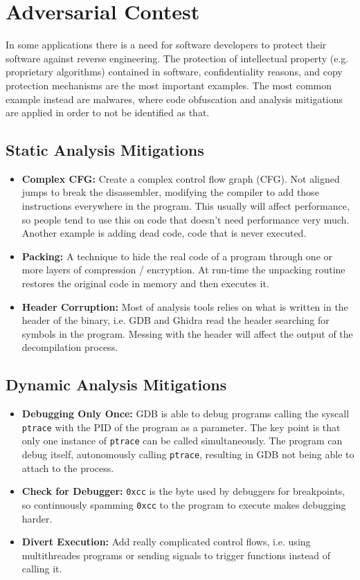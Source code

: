 \documentclass{article}
\begin{document}
\pagebreak
\section{Adversarial Contest}

In some applications there is a need for software developers to protect their software against reverse engineering. 
The protection of intellectual property (e.g. proprietary algorithms) contained in software, confidentiality reasons, 
and copy protection mechanisms are the most important examples. \citep{codeobf} 
The most common example instead are malwares, where code obfuscation and analysis
mitigations are applied in order to not be identified as that.

\subsection{Static Analysis Mitigations}

\begin{itemize}
\item{\textbf{Complex CFG:}} Create a complex control flow graph (CFG). Not aligned jumps to break the disassembler, 
modifying the compiler to add those instructions everywhere in the program. This usually will affect 
performance, so people tend to use this on code that doesn’t need performance very much. Another example is adding 
dead code, code that is never executed.
\item{\textbf{Packing:}} A technique to hide the real code of a program through one or more layers of compression / 
encryption. At run-time the unpacking routine restores the original code in memory and then executes it.
\item{\textbf{Header Corruption:}} Most of analysis tools relies on what is written in the header of the binary,
i.e. GDB and Ghidra read the header searching for symbols in the program. Messing with the header will affect the
output of the decompilation process.
\end{itemize}

\subsection{Dynamic Analysis Mitigations}

\begin{itemize}
\item{\textbf{Debugging Only Once:}} GDB is able to debug programs calling the syscall \texttt{ptrace} with the PID of
the program as a parameter. The key point is that only one instance of \texttt{ptrace} can be called simultaneously. 
The program can debug itself, autonomously calling \texttt{ptrace}, resulting in GDB not being able to attach to 
the process.
\item{\textbf{Check for Debugger:}} \texttt{0xcc} is the byte used by debuggers for breakpoints, so continuously
spamming \texttt{0xcc} to the program to execute makes debugging harder.
\item{\textbf{Divert Execution:}} Add really complicated control flows, i.e. using multithreades programs or 
sending signals to trigger functions instead of calling it.
\end{itemize}
\end{document}
